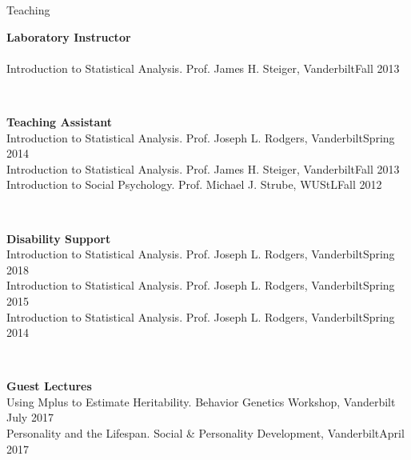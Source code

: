 \begin{rSection}{\textrm{Teaching}}
\begin{minipage}{\linewidth}{\large {\bf Laboratory Instructor}\\}
\smallskip\\
Introduction to Statistical Analysis. Prof. James H. Steiger, Vanderbilt\hfill  {Fall 2013}%
\end{minipage}
\medskip\\
\begin{minipage}{\linewidth}{\large {\bf Teaching Assistant}}\\
Introduction to Statistical Analysis. Prof. Joseph L. Rodgers, Vanderbilt\hfill  {Spring 2014}\smallskip\\
Introduction to Statistical Analysis. Prof. James H. Steiger, Vanderbilt\hfill  {Fall 2013}\smallskip\\
Introduction to Social Psychology. Prof. Michael J. Strube, WUStL\hfill{Fall 2012}\end{minipage}\medskip\\
\begin{minipage}{\linewidth}{\large {\bf Disability Support}}\\
Introduction to Statistical Analysis. Prof. Joseph L. Rodgers, Vanderbilt\hfill  {Spring 2018}\smallskip\\
Introduction to Statistical Analysis. Prof. Joseph L. Rodgers, Vanderbilt\hfill  {Spring 2015}\smallskip\\
Introduction to Statistical Analysis. Prof. Joseph L. Rodgers, Vanderbilt\hfill{Spring 2014}\end{minipage}\medskip\\
\begin{minipage}{\linewidth}{\large {\bf Guest Lectures}}\\
Using Mplus to Estimate Heritability. Behavior Genetics Workshop, Vanderbilt \hfill{July 2017}\\
Personality and the Lifespan. Social \& Personality Development, Vanderbilt\hfill {April 2017}\end{minipage}
\end{rSection}
